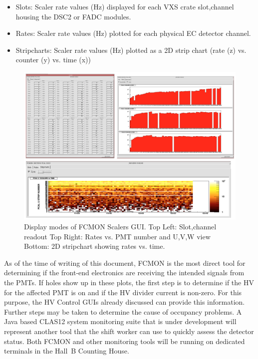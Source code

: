 \documentclass[letterpaper,10pt]{article}
\begin{document}
\begin{itemize}
\item Slots: Scaler rate values (Hz) displayed for each VXS crate slot,channel housing the DSC2 or FADC modules.
\item Rates: Scaler rate values (Hz) plotted for each physical EC detector channel.
\item Stripcharts: Scaler rate values (Hz) plotted as a 2D strip chart (rate (z) vs. counter (y)  vs. time (x))
\end{itemize}

\begin{figure}[htbp]
  \centering
  \includegraphics[width= 7in, keepaspectratio = true]{fcmon-screens}
  \vspace{2mm}
  \caption{Display modes of FCMON Scalers GUI. Top Left: Slot,channel readout Top Right: Rates vs. PMT
    number and U,V,W view Bottom: 2D stripchart showing rates vs. time.}
\label{fcmon2}
\end{figure}

As of the time of writing of this document, FCMON is the most direct tool for determining if the front-end
electronics are receiving the intended signals from the PMTs. If holes show up in these plots, the first step is
to determine if the HV for the affected PMT is on and if the HV divider current is non-zero.  For this purpose, the
HV Control GUIs already discussed can provide this information.  Further steps may be taken to determine the cause
of occupancy problems.  A Java based CLAS12 system monitoring suite that is under development will
represent another tool that the shift worker can use to quickly assess the detector status. Both FCMON and 
other monitoring tools will be running on dedicated terminals in the Hall~B Counting House.
\end{document}
